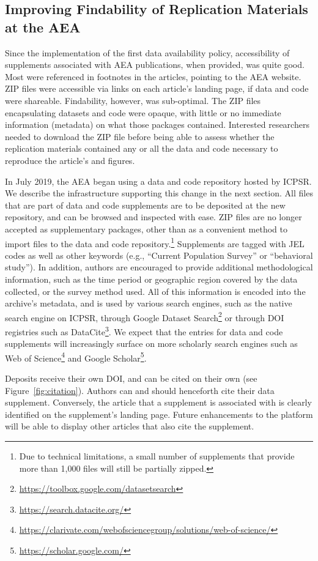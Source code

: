 \documentclass[PP]{AEA}
\newcommand{\urlcite}[2]{#2\footnote{\url{#1}}}
\begin{document}
\subsection{Improving Findability of Replication Materials at the AEA}
\label{sec:findability}

Since the implementation of the first data availability policy, accessibility of supplements associated with AEA publications, when provided, was quite good. Most were referenced in footnotes in the articles, pointing to the AEA website. ZIP files were accessible via links on each article's landing page, if data and code were  shareable. Findability, however, was sub-optimal. The ZIP files encapsulating datasets and code were opaque, with little or no immediate information (metadata) on what those packages contained. Interested researchers needed to download the ZIP file before being able to assess whether the replication materials contained any or all the data and code necessary to reproduce the article's and figures.

In July 2019, the AEA began using a data and code repository hosted by \ac{ICPSR}. We describe the infrastructure supporting this change in the next section. All files that are part of data and code supplements are to be deposited at the new repository,  and can be browsed and inspected with ease. ZIP files are no longer  accepted as supplementary packages, other than as a convenient method to import files to the data and code repository.\footnote{Due to technical limitations, a small number of supplements that provide more than 1,000 files will still be partially zipped.} Supplements are  tagged with JEL codes as well as other keywords (e.g., ``Current Population Survey'' or ``behavioral study''). In addition, authors are encouraged to provide additional methodological information, such as the time period or geographic region covered by the data collected, or the survey method used. All of this information is encoded into the archive's metadata, and is used by various search engines, such as the native search engine on ICPSR, through \urlcite{https://toolbox.google.com/datasetsearch}{Google Dataset Search} or through \ac{DOI} registries such as \urlcite{https://search.datacite.org/}{DataCite}. We expect that the  entries for data and code supplements will  increasingly surface on more scholarly search engines such as \urlcite{https://clarivate.com/webofsciencegroup/solutions/web-of-science/}{Web of Science} and \urlcite{https://scholar.google.com/}{Google Scholar}.

Deposits receive their own \ac{DOI}, and can be cited on their own (see Figure~\ref{fig:citation}). Authors can and should henceforth cite their data supplement. Conversely, the article that a supplement is associated with is clearly identified on the supplement's landing page. Future enhancements to the platform will be able to display other articles that also cite the supplement. 
\end{document}
